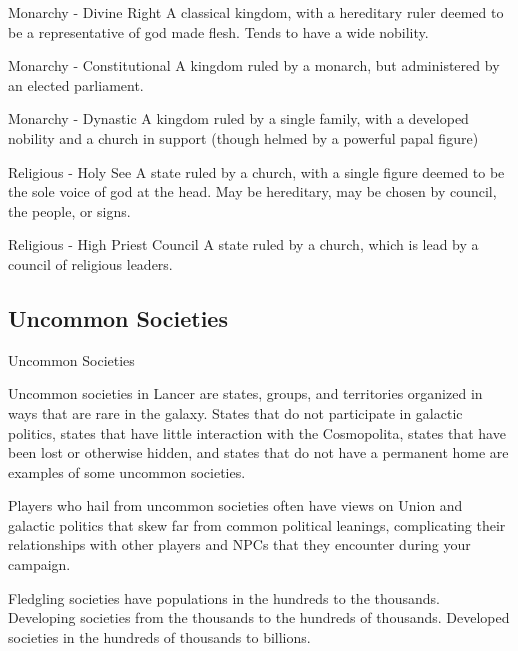  Monarchy - Divine Right                               A classical kingdom, with a hereditary ruler  
                                                       deemed to be a representative of god made  
                                                       flesh. Tends to have a wide nobility.  

 Monarchy - Constitutional                             A kingdom ruled by a monarch, but  
                                                       administered by an elected parliament.  

 Monarchy - Dynastic                                   A kingdom ruled by a single family, with a  
                                                       developed nobility and a church in support  
                                                       (though helmed by a powerful papal figure) 

 Religious - Holy See                                  A state ruled by a church, with a single figure  
                                                       deemed to be the sole voice of god at the  
                                                       head. May be hereditary, may be chosen by  
                                                       council, the people, or signs.  

 Religious - High Priest Council                       A state ruled by a church, which is lead by a  
                                                       council of religious leaders.  
\subsection{Uncommon Societies}
Uncommon Societies  

Uncommon societies in Lancer are states, groups, and territories organized in ways that are rare  
in the galaxy. States that do not participate in galactic politics, states that have little interaction  
with the Cosmopolita, states that have been lost or otherwise hidden, and states that do not  
have a permanent home are examples of some uncommon societies. 
 

Players who hail from uncommon societies often have views on Union and galactic politics that  
skew far from common political leanings, complicating their relationships with other players and  
NPCs that they encounter during your campaign. 
 

Fledgling societies have populations in the hundreds to the thousands. Developing societies  
from the thousands to the hundreds of thousands. Developed societies in the hundreds of  
thousands to billions.  
 

